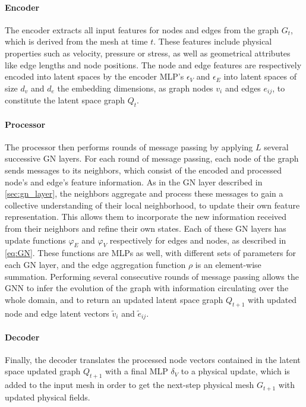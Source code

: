 \paragraph{Encoder} The encoder extracts all input features for nodes and edges from the graph $G_t$, which is derived from the mesh at time $t$. These features include physical properties such as velocity, pressure or stress, as well as geometrical attributes like edge lengths and node positions. The node and edge features are respectively encoded into latent spaces by the encoder MLP's $\epsilon_V$ and $\epsilon_E$ into latent spaces of size $d_v$ and $d_e$ the embedding dimensions, as graph nodes $v_i$ and edges $e_{ij}$, to constitute the latent space graph $Q_t$.


\paragraph{Processor} The processor then performs rounds of message passing by applying $L$ several successive GN layers. For each round of message passing, each node of the graph sends messages to its neighbors, which consist of the encoded and processed node’s and edge’s feature information. As in the GN layer described in \autoref{sec:gn_layer}, the neighbors aggregate and process these messages to gain a collective understanding of their local neighborhood, to update their own feature representation. This allows them to incorporate the new information received from their neighbors and refine their own states. Each of these GN layers has update functions $\varphi_E$ and $\varphi_V$ respectively for edges and nodes, as described in \autoref{eq:GN}. These functions are MLPs as well, with different sets of parameters for each GN layer, and the edge aggregation function $\rho$ is an element-wise summation. Performing several consecutive rounds of message passing allows the GNN to infer the evolution of the graph with information circulating over the whole domain, and to return an updated latent space graph $Q_{t+1}$ with updated node and edge latent vectors $\tilde{v}_i$ and $\tilde{e}_{ij}$. 

\paragraph{Decoder} Finally, the decoder translates the processed node vectors contained in the latent space updated graph $Q_{t+1}$ with a final MLP $\delta_V$ to a physical update, which is added to the input mesh in order to get the next-step physical mesh $G_{t+1}$ with updated physical fields. 

